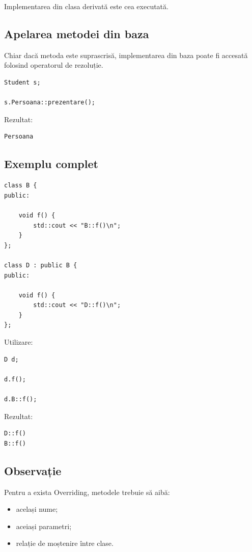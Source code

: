 \documentclass[12pt,a4paper]{article}
\begin{document}
Implementarea din clasa derivată este cea executată.

\subsection{Apelarea metodei din baza}

Chiar dacă metoda este suprascrisă, implementarea din baza poate fi accesată folosind operatorul de rezoluție.

\begin{verbatim}
Student s;

s.Persoana::prezentare();
\end{verbatim}

Rezultat:

\begin{verbatim}
Persoana
\end{verbatim}

\subsection{Exemplu complet}

\begin{verbatim}
class B {
public:

    void f() {
        std::cout << "B::f()\n";
    }
};

class D : public B {
public:

    void f() {
        std::cout << "D::f()\n";
    }
};
\end{verbatim}

Utilizare:

\begin{verbatim}
D d;

d.f();

d.B::f();
\end{verbatim}

Rezultat:

\begin{verbatim}
D::f()
B::f()
\end{verbatim}

\subsection{Observație}

Pentru a exista Overriding, metodele trebuie să aibă:

\begin{itemize}
\item același nume;
\item aceiași parametri;
\item relație de moștenire între clase.
\end{itemize}
\end{document}
